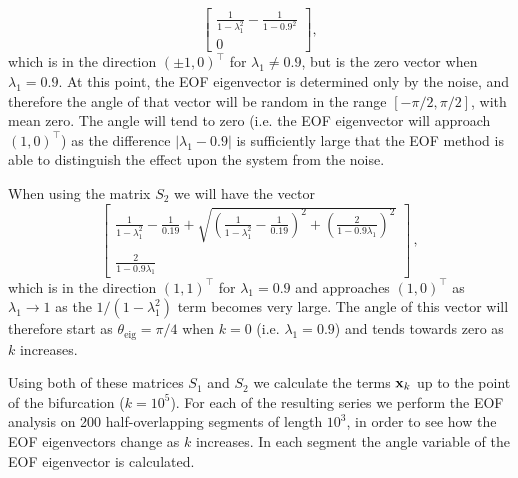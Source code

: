 \begin{equation}
	\left[\begin{array}{c}
	\frac{1}{1-\lambda_1^2}-\frac{1}{1-0.9^2}\\
	0
	\end{array}\right],
\label{eqn:2D:S1expected_eigenvector}
\end{equation}
which is in the direction $(\pm 1,0)^\top$ for $\lambda_1\neq 0.9$, but is the zero vector when $\lambda_1= 0.9$. At this point, the EOF eigenvector is determined only by the noise, and therefore the angle of that vector will be random in the range $[-\pi/2, \pi/2]$, with mean zero. The angle will tend to zero (i.e. the EOF eigenvector will approach $(1,0)^\top$) as the difference $|\lambda_1-0.9|$ is sufficiently large that the EOF method is able to distinguish the effect upon the system from the noise. 

When using the matrix $S_2$ we will have the vector
\begin{equation}
\left[\begin{array}{c}
\frac{1}{1-\lambda_1^2}-\frac{1}{0.19} + \sqrt{\left(\frac{1}{1-\lambda_1^2}-\frac{1}{0.19}\right)^2+\left(\frac{2}{1-0.9\lambda_1}\right)^2}\\
~\\
\frac{2}{1-0.9\lambda_1}
\end{array}\right]\,,
\label{eqn:2D:S2expected_eigenvector}
\end{equation}
which is in the direction $(1,1)^\top$ for $\lambda_1=0.9$ and approaches $(1,0)^\top$ as $\lambda_1\rightarrow 1$ as the $1/(1-\lambda_1^2)$ term becomes very large. The angle of this vector will therefore start as $\theta_\text{eig} = \pi/4$ when $k=0$ (i.e. $\lambda_1=0.9$) and tends towards zero as $k$ increases. 

Using both of these matrices $S_1$ and $S_2$ we calculate the terms $\mathbf{x}_k$ up to the point of the bifurcation ($k=10^5$). For each of the resulting series we perform the EOF analysis on 200 half-overlapping segments of length $10^3$, in order to see how the EOF eigenvectors change as $k$ increases. In each segment the angle variable of the EOF eigenvector is calculated.

